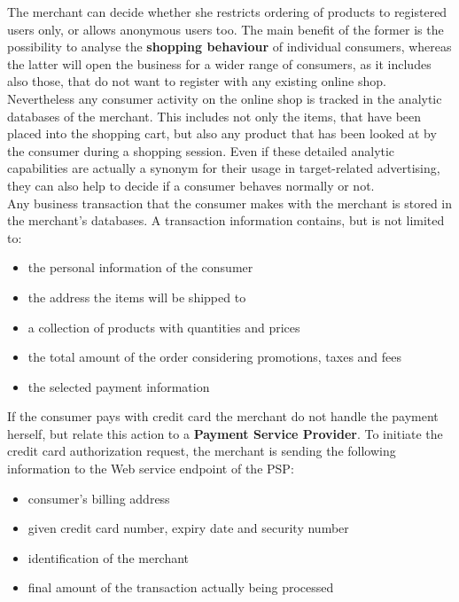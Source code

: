 The merchant can decide whether she restricts ordering of products to registered users only, or allows anonymous users too. The main benefit of the former is the possibility to analyse the \textbf{shopping behaviour} of individual consumers, whereas the latter will open the business for a wider range of consumers, as it includes also those, that do not want to register with any existing online shop. Nevertheless any consumer activity on the online shop is tracked in the analytic databases of the merchant. This includes not only the items, that have been placed into the shopping cart, but also any product that has been looked at by the consumer during a shopping session. Even if these detailed analytic capabilities are actually a synonym for their usage in target-related advertising, they can also help to decide if a consumer behaves normally or not. \\

Any business transaction that the consumer makes with the merchant is stored in the merchant's databases. A transaction information contains, but is not limited to:\@

\begin{itemize}
		\item the personal information of the consumer
		\item the address the items will be shipped to
		\item a collection of products with quantities and prices
		\item the total amount of the order considering promotions, taxes and fees
		\item the selected payment information
\end{itemize}

If the consumer pays with credit card the merchant do not handle the payment herself, but relate this action to a \textbf{Payment Service Provider}. To initiate the credit card authorization request, the merchant is sending the following information to the Web service endpoint of the \gls{PSP}: \@

\begin{itemize}
    \item consumer's billing address
    \item given credit card number, expiry date and security number
    \item identification of the merchant
    \item final amount of the transaction actually being processed
\end{itemize}

